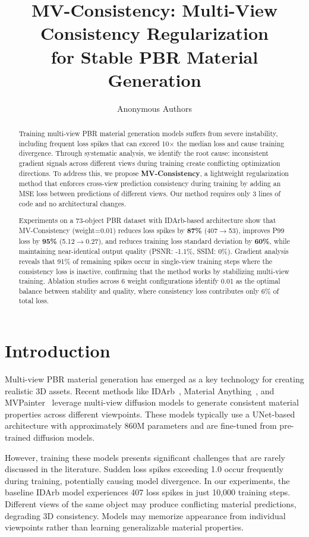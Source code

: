 \documentclass{article}
\title{MV-Consistency: Multi-View Consistency Regularization\\for Stable PBR Material Generation}
\author{Anonymous Authors}
\begin{document}
\maketitle

\begin{abstract}
Training multi-view PBR material generation models suffers from severe instability, including frequent loss spikes that can exceed 10$\times$ the median loss and cause training divergence. Through systematic analysis, we identify the root cause: inconsistent gradient signals across different views during training create conflicting optimization directions. To address this, we propose \textbf{MV-Consistency}, a lightweight regularization method that enforces cross-view prediction consistency during training by adding an MSE loss between predictions of different views. Our method requires only 3 lines of code and no architectural changes.

Experiments on a 73-object PBR dataset with IDArb-based architecture show that MV-Consistency (weight=0.01) reduces loss spikes by \textbf{87\%} (407$\to$53), improves P99 loss by \textbf{95\%} (5.12$\to$0.27), and reduces training loss standard deviation by \textbf{60\%}, while maintaining near-identical output quality (PSNR: -1.1\%, SSIM: 0\%). Gradient analysis reveals that 91\% of remaining spikes occur in single-view training steps where the consistency loss is inactive, confirming that the method works by stabilizing multi-view training. Ablation studies across 6 weight configurations identify 0.01 as the optimal balance between stability and quality, where consistency loss contributes only 6\% of total loss.
\end{abstract}

\section{Introduction}

Multi-view PBR material generation has emerged as a key technology for creating realistic 3D assets. Recent methods like IDArb~\cite{idarb}, Material Anything~\cite{materialanything}, and MVPainter~\cite{mvpainter} leverage multi-view diffusion models to generate consistent material properties across different viewpoints. These models typically use a UNet-based architecture with approximately 860M parameters and are fine-tuned from pre-trained diffusion models.

However, training these models presents significant challenges that are rarely discussed in the literature. Sudden loss spikes exceeding 1.0 occur frequently during training, potentially causing model divergence. In our experiments, the baseline IDArb model experiences 407 loss spikes in just 10,000 training steps. Different views of the same object may produce conflicting material predictions, degrading 3D consistency. Models may memorize appearance from individual viewpoints rather than learning generalizable material properties.
\end{document}
